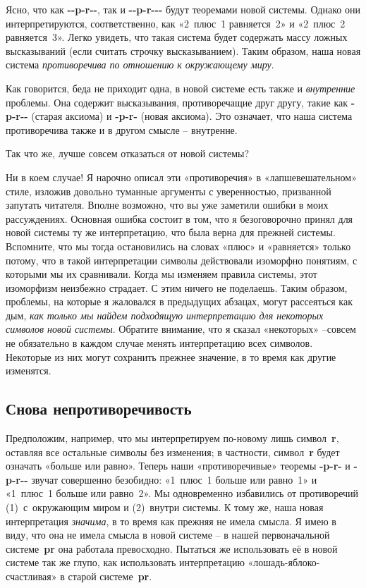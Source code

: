 \documentclass[../main.tex]{subfiles}
\begin{document}
Ясно, что как \textbf{-{}-p-r-{}-}, так и \textbf{-{}-p-r-{}-{}-} будут теоремами новой системы. Однако они интерпретируются, соответственно, как «2~плюс~1 равняется~2» и «2~плюс~2 равняется~3». Легко увидеть, что такая система будет содержать массу ложных высказываний (если считать строчку высказыванием). Таким образом, наша новая система \emph{противоречива по отношению к окружающему миру}.

Как говорится, беда не приходит одна, в новой системе есть также и \emph{внутренние} проблемы. Она содержит высказывания, противоречащие друг другу, такие как \textbf{-p-r-{}-} (старая аксиома) и \textbf{-p-r-} (новая аксиома). Это означает, что наша система противоречива также и в другом смысле \--- внутренне.

Так что же, лучше совсем отказаться от новой системы?

Ни в коем случае! Я нарочно описал эти «противоречия» в «лапшевешательном» стиле, изложив довольно туманные аргументы с уверенностью, призванной запутать читателя. Вполне возможно, что вы уже заметили ошибки в моих рассуждениях. Основная ошибка состоит в том, что я безоговорочно принял для новой системы ту же интерпретацию, что была верна для прежней системы. Вспомните, что мы тогда остановились на словах «плюс» и «равняется» только потому, что в такой интерпретации символы действовали изоморфно понятиям, с которыми мы их сравнивали. Когда мы изменяем правила системы, этот изоморфизм неизбежно страдает. С этим ничего не поделаешь. Таким образом, проблемы, на которые я жаловался в предыдущих абзацах, могут рассеяться как дым, \emph{как только мы найдем подходящую интерпретацию для некоторых символов новой системы}. Обратите внимание, что я сказал «некоторых» \---совсем не обязательно в каждом случае менять интерпретацию всех символов. Некоторые из них могут сохранить прежнее значение, в то время как другие изменятся.


\subsection{Снова непротиворечивость}

Предположим, например, что мы интерпретируем по-новому лишь символ~\textbf{r}, оставляя все остальные символы без изменения; в частности, символ~\textbf{r} будет означать «больше или равно». Теперь наши «противоречивые» теоремы \textbf{-p-r-} и \textbf{-p-r-{}-} звучат совершенно безобидно: «1~плюс~1 больше или равно~1» и «1~плюс~1 больше или равно~2». Мы одновременно избавились от противоречий (1)~с~окружающим миром и (2)~внутри системы. К тому же, наша новая интерпретация \emph{значима}, в то время как прежняя не имела смысла. Я имею в виду, что она не имела смысла в новой системе \--- в нашей первоначальной системе~\textbf{pr} она работала превосходно. Пытаться же использовать её в новой системе так же глупо, как использовать интерпретацию «лошадь-яблоко-счастливая» в старой системе~\textbf{pr}.
\end{document}
